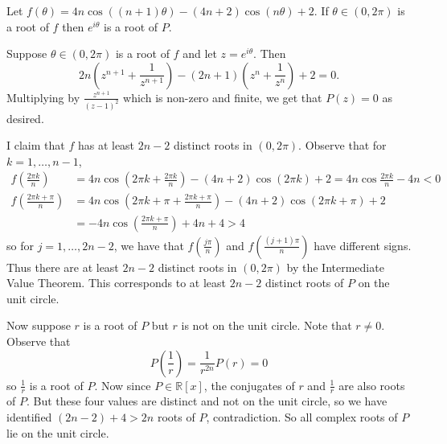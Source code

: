 \begin{solutionlemma}
Let $f\left(\theta\right)=4n\cos\left(\left(n+1\right)\theta\right)-\left(4n+2\right)\cos\left(n\theta\right)+2$. If $\theta\in\left(0,2\pi\right)$ is a root of $f$ then $e^{i\theta}$ is a root of $P$.
\end{solutionlemma}

\begin{lemmaproof}
Suppose $\theta\in\left(0,2\pi\right)$ is a root of $f$ and let $z=e^{i\theta}$. Then \[2n\left(z^{n+1}+\frac{1}{z^{n+1}}\right)-\left(2n+1\right)\left(z^n+\frac{1}{z^n}\right)+2=0.\] Multiplying by $\frac{z^{n+1}}{\left(z-1\right)^2}$ which is non-zero and finite, we get that $P\left(z\right)=0$ as desired.
\end{lemmaproof}

I claim that $f$ has at least $2n-2$ distinct roots in $\left(0,2\pi\right)$. Observe that for $k=1,\ldots,n-1$,
\begin{align*}
	f\left(\frac{2\pi k}{n}\right)&=4n\cos\left(2\pi k+\frac{2\pi k}{n}\right)-\left(4n+2\right)\cos\left(2\pi k\right)+2=4n\cos\frac{2\pi k}{n}-4n<0\\
	f\left(\frac{2\pi k+\pi}{n}\right)&=4n\cos\left(2\pi k+\pi+\frac{2\pi k+\pi}{n}\right)-\left(4n+2\right)\cos\left(2\pi k+\pi\right)+2\\&=-4n\cos\left(\frac{2\pi k+\pi}{n}\right)+4n+4>4
\end{align*}
so for $j=1,\ldots,2n-2$, we have that $f\left(\frac{j\pi}{n}\right)$ and $f\left(\frac{\left(j+1\right)\pi}{n}\right)$ have different signs. Thus there are at least $2n-2$ distinct roots in $\left(0,2\pi\right)$ by the Intermediate Value Theorem. This corresponds to at least $2n-2$ distinct roots of $P$ on the unit circle.

Now suppose $r$ is a root of $P$ but $r$ is not on the unit circle. Note that $r\neq0$. Observe that \[P\left(\frac{1}{r}\right)=\frac{1}{r^{2n}}P\left(r\right)=0\] so $\frac{1}{r}$ is a root of $P$. Now since $P\in\mathbb{R}\left[x\right]$, the conjugates of $r$ and $\frac{1}{r}$ are also roots of $P$. But these four values are distinct and not on the unit circle, so we have identified $\left(2n-2\right)+4>2n$ roots of $P$, contradiction. So all complex roots of $P$ lie on the unit circle.
